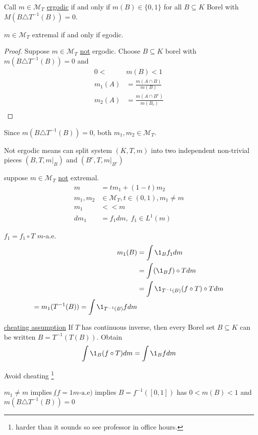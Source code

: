 \begin{definition}
	Call $m \in \mathcal{M}_T$ \underline{ergodic} if and only if $m(B) \in \{0,1\}$ for all 
	$B \subseteq K$ Borel with $M(B \triangle T^{-1}(B)) = 0$.
\end{definition}

\begin{theorem}
	$m \in \mathcal{M}_T$ extremal if and only if egodic.
\end{theorem}


\begin{proof}
	Suppose $m \in \mathcal{M}_T$ \underline{not} ergodic.
	Choose $B \subseteq K$ borel with $m(B \triangle T^{-1}(B)) = 0$ and 
	\begin{align*}
		0 < &m(B) < 1 \\
		m_1 (A) &= \frac{m(A \cap B)}{ m(B)} \\
		m_2 (A) &= \frac{m(A \cap B^{c})}{ m(B_{c})} \\
	\end{align*}
\end{proof}

\begin{exercise}
	Since $m (B \triangle T^{-1}(B)) = 0$, both $m_1, m_2 \in \mathcal{M}_T$.
\end{exercise}

\begin{remark}
	Not ergodic means can split system $(K, T, m)$ into two independent non-trivial pieces  $(B,T, m|_{B})$ and $(B^c, T, m|_{B^c})$
\end{remark}


suppose $m \in \mathcal{M}_T$ \underline{not} extremal.
\begin{align*}
	m &= t m_1 + (1-t) m_2 \\
	m_1, m_2 &\in \mathcal{M}_T, t \in (0,1), m_1 \neq m \\
	m_1 &<< m \\
	dm_1 &= f_1 dm, \; f_1 \in L^1 (m)
\end{align*}  

\begin{claim}
	$f_1 = f_1 \circ T$ $m$-a.e.
	\begin{align*}
		m_1 (B) &= \int \1_{B} f_1 dm \\
				&= \int (\1_{B} f) \circ T dm \\
				&= \int \1_{T^{-1}(B)} (f \circ T) \circ T dm \\
				= m_1 (T^{-1}(B)) = \int \1_{T^{-1}(B)} f dm
	\end{align*} 
\end{claim}

\underline{cheating assumption} If $T$ has continuous inverse, then every Borel set $B \subseteq K$ can be written
$B = T^{-1}(T(B))$.
Obtain
\[
	\int \1_{B} (f \circ T ) dm = \int \1_{B} f dm
\] 

\begin{exercise}
	Avoid cheating
	\footnote{harder than it sounds so see professor in office hours.}
\end{exercise}

$m_1 \neq m$ implies $\not (f = 1 m\text{-a.e})$ implies $B = f^{-1}([0,1])$ has
$0 < m(B) < 1$ and $m (B \triangle T^{-1}(B)) = 0$
